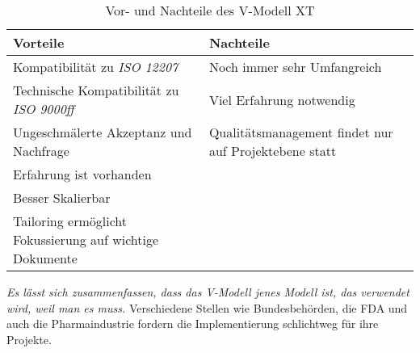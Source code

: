 \begin{table}[H]
    \centering
    \begin{tabulary}{0.9\textwidth}{|p{0.45\textwidth}|p{0.45\textwidth}|}
    \hline 
     Vorteile & Nachteile \\ 
    \hline 
    Kompatibilität zu \textit{ISO 12207} & Noch immer sehr Umfangreich \\
    \hline 
    Technische Kompatibilität zu \textit{ISO 9000ff} & Viel Erfahrung notwendig \\
    \hline
    Ungeschmälerte Akzeptanz und Nachfrage & Qualitätsmanagement findet nur auf Projektebene statt \\
    \hline
    Erfahrung ist vorhanden &  \\ 
    \hline
    Besser Skalierbar &  \\ 
    \hline
    Tailoring ermöglicht Fokussierung auf wichtige Dokumente &  \\
    \hline
    \end{tabulary} 
    \caption[Vor- und Nachteile des V-Modell XT]{Vor- und Nachteile des V-Modell XT}
    \label{tabelle_VModellXTVorNachteile}
\end{table}

\textit{Es lässt sich zusammenfassen, dass das V-Modell jenes Modell ist, das verwendet wird, weil man es muss.} Verschiedene Stellen wie Bundesbehörden, die FDA und auch die Pharmaindustrie fordern die Implementierung schlichtweg für ihre Projekte.